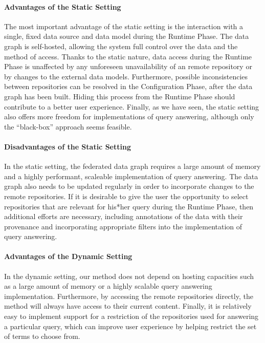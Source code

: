 \paragraph{Advantages of the Static Setting}

The most important advantage of the static setting is the interaction with a single, fixed data source
and data model during the Runtime Phase.
The data graph is self-hosted, allowing the system full control over the data
and the method of access.
Thanks to the static nature, data access during the Runtime Phase is
unaffected by any unforeseen unavailability of an remote repository
or by changes to the external data models.
Furthermore, possible inconsistencies between repositories
can be resolved in the Configuration Phase, after the data graph has been built. Hiding this process from the Runtime Phase
should contribute to a better user experience.
Finally, as we have seen, the static setting also offers more freedom for implementations of
query answering, although only the \enquote{black-box} approach seems feasible.

\paragraph{Disadvantages of the Static Setting}

In the static setting, the federated data graph requires a large amount of memory
and a highly performant, scaleable implementation of query answering.
The data graph also needs to be updated regularly in order to incorporate changes
to the remote repositories.
If it is desirable to give the user the opportunity to select repositories 
that are relevant for his*her query during the Runtime Phase, 
then additional efforts are necessary, including annotations of the data
with their provenance and incorporating appropriate filters into the implementation
of query answering.

\paragraph{Advantages of the Dynamic Setting}

In the dynamic setting, our method does not depend on hosting capacities
such as a large amount of memory or a highly scalable query answering implementation.
Furthermore, by accessing the remote repositories directly,
the method will always have access to their current content.
Finally, it is relatively easy to implement support for 
a restriction of the repositories used for answering a particular query,
which can improve user experience by helping restrict the set of terms to choose from.

